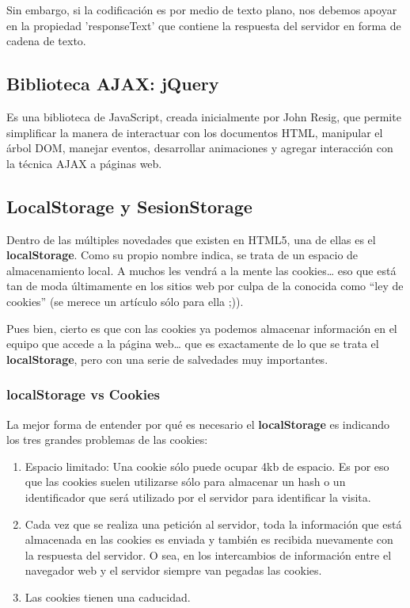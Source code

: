 \documentclass{apuntes}
\begin{document}
Sin embargo, si la codificación es por medio de texto plano, nos debemos apoyar en la propiedad 'responseText' que contiene la respuesta del servidor en forma de cadena de texto.

\subsection{Biblioteca AJAX: jQuery}
\begin{defn}[jQuery]
Es una biblioteca de JavaScript, creada inicialmente por John Resig, que permite simplificar la manera de interactuar con los documentos HTML, manipular el árbol DOM, manejar eventos, desarrollar animaciones y agregar interacción con la técnica AJAX a páginas web.
\end{defn}

\subsection{LocalStorage y SesionStorage}
Dentro de las múltiples novedades que existen en HTML5, una de ellas es el \textbf{localStorage}. Como su propio nombre indica, se trata de un espacio de almacenamiento local. A muchos les vendrá a la mente las cookies… eso que está tan de moda últimamente en los sitios web por culpa de la conocida como “ley de cookies” (se merece un artículo sólo para ella ;)).

Pues bien, cierto es que con las cookies ya podemos almacenar información en el equipo que accede a la página web… que es exactamente de lo que se trata el \textbf{localStorage}, pero con una serie de salvedades muy importantes.

\subsubsection{localStorage vs Cookies}
La mejor forma de entender por qué es necesario el \textbf{localStorage} es indicando los tres grandes problemas de las cookies:
\begin{enumerate}
\item Espacio limitado: Una cookie sólo puede ocupar 4kb de espacio. Es por eso que las cookies suelen utilizarse sólo para almacenar un hash o un identificador que será utilizado por el servidor para identificar la visita.
\item Cada vez que se realiza una petición al servidor, toda la información que está almacenada en las cookies es enviada y también es recibida nuevamente con la respuesta del servidor. O sea, en los intercambios de información entre el navegador web y el servidor siempre van pegadas las cookies.
\item Las cookies tienen una caducidad.
\end{enumerate}
\end{document}
